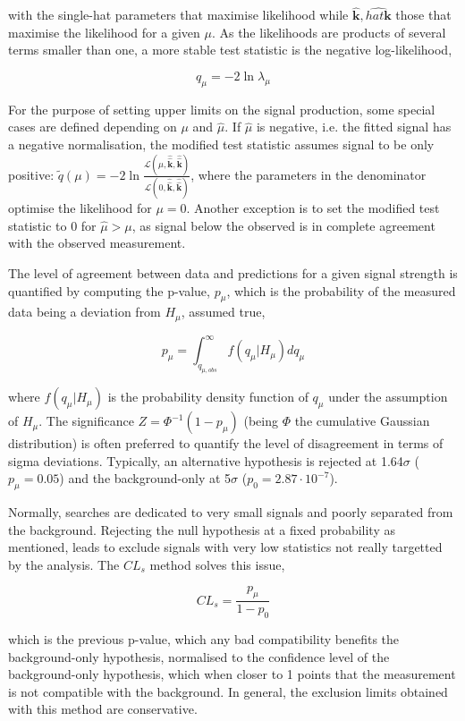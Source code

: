 with the single-hat parameters that maximise likelihood while $\hat{\mathbf{k}},\hat{hat{\mathbf{k}}}$ those that maximise the likelihood for a given $\mu$. As the likelihoods are products of several terms smaller than one, a more stable test statistic is the negative log-likelihood,

\begin{equation}
    q_\mu = -2\ln\lambda_\mu
\end{equation}

For the purpose of setting upper limits on the signal production, some special cases are defined depending on $\mu$ and $\hat{\mu}$. If $\hat{\mu}$ is negative, i.e. the fitted signal has a negative normalisation, the modified test statistic assumes signal to be only positive: $\tilde{q}(\mu)=-2\ln\frac{\mathscr{L}(\mu, \hat{\hat{\mathbf{k}}},\hat{\hat{\mathbf{k}}})}{\mathscr{L}(0, \hat{\hat{\mathbf{k}}},\hat{\hat{\mathbf{k}}})}$, where the parameters in the denominator optimise the likelihood for $\mu=0$. Another exception is to set the modified test statistic to 0 for $\hat{\mu}>\mu$, as signal below the observed is in complete agreement with the observed measurement.

The level of agreement between data and predictions for a given signal strength is quantified by computing the p-value, $p_\mu$, which is the probability of the measured data being a deviation from $H_\mu$, assumed true,

\begin{equation}
    p_\mu = \int_{q_{\mu,obs}}^\infty f(q_\mu|H_\mu)dq_\mu
\end{equation}

where $f(q_\mu|H_\mu)$ is the probability density function of $q_\mu$ under the assumption of $H_\mu$. The significance $Z=\Phi^{-1}(1-p_\mu)$ (being $\Phi$ the cumulative Gaussian distribution) is often preferred to quantify the level of disagreement in terms of sigma deviations. Typically, an alternative hypothesis is rejected at 1.64$\sigma$ ($p_\mu=0.05$) and the background-only at 5$\sigma$ ($p_0=2.87\cdot10^{-7}$).

Normally, searches are dedicated to very small signals and poorly separated from the background. Rejecting the null hypothesis at a fixed probability as mentioned, leads to exclude signals with very low statistics not really targetted by the analysis. %
The $CL_{s}$ method solves this issue,

\begin{equation}
    CL_{s}=\frac{p_\mu}{1-p_0}
\end{equation}

which is the previous p-value, which any bad compatibility benefits the background-only hypothesis, normalised to the confidence level of the background-only hypothesis, which when closer to 1 points that the measurement is not compatible with the background. In general, the exclusion limits obtained with this method are conservative.